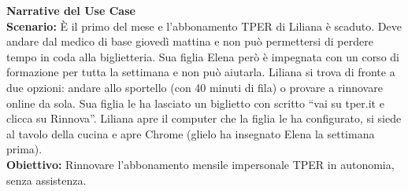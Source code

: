 \documentclass[11pt,a4paper]{article}
\begin{document}
\begin{tcolorbox}[colback=backgroundColor,colframe=borderColor,arc=2mm]
    \textbf{Narrative del Use Case} \\[4pt]
    {\small
    \textbf{Scenario:} È il primo del mese e l'abbonamento TPER di Liliana è scaduto. Deve andare dal medico di base giovedì mattina e non può permettersi di perdere tempo in coda alla biglietteria. Sua figlia Elena però è impegnata con un corso di formazione per tutta la settimana e non può aiutarla. Liliana si trova di fronte a due opzioni: andare allo sportello (con 40 minuti di fila) o provare a rinnovare online da sola. Sua figlia le ha lasciato un biglietto con scritto ``vai su tper.it e clicca su Rinnova''. Liliana apre il computer che la figlia le ha configurato, si siede al tavolo della cucina e apre Chrome (glielo ha insegnato Elena la settimana prima). \\[4pt]

    \textbf{Obiettivo:} Rinnovare l'abbonamento mensile impersonale TPER in autonomia, senza assistenza. \\[4pt]

}
\end{tcolorbox}
\end{document}
